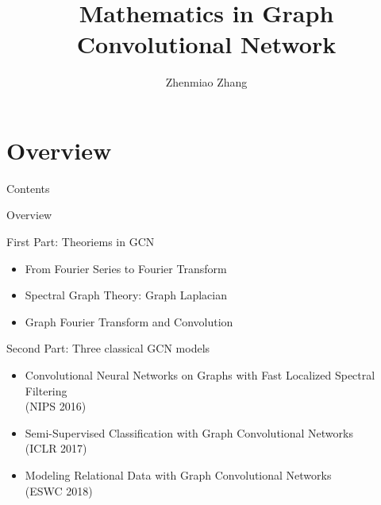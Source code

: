 \documentclass{beamer}
\title[Graph Convolutional Network]{Mathematics in Graph Convolutional Network}
\author{Zhenmiao Zhang}
\begin{document}
	\begin{frame}
	    \maketitle
	\end{frame}
	
	\section{Overview}
		\begin{frame}{Contents}
			\small
		\end{frame}
		\begin{frame}{Overview}
			\begin{block}{First Part: Theoriems in GCN}
				\begin{itemize}
					\item From Fourier Series to Fourier Transform
					\item Spectral Graph Theory: Graph Laplacian
					\item Graph Fourier Transform and Convolution
				\end{itemize}
			\end{block}
			\begin{block}{Second Part: Three classical GCN models}
				\begin{itemize}
					\item Convolutional Neural Networks on Graphs with Fast Localized Spectral Filtering\\(NIPS 2016)
					\item Semi-Supervised Classification with Graph Convolutional Networks \\(ICLR 2017)
					\item Modeling Relational Data with Graph Convolutional Networks \\(ESWC 2018)
				\end{itemize}
			\end{block}
		\end{frame}
	
\end{document}
